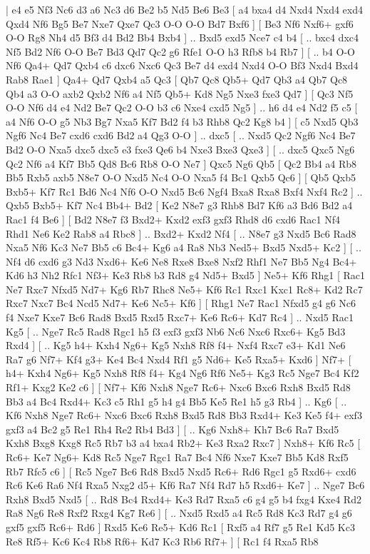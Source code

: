 \makegametitle 
|   e4   e5    Nf3   Nc6    d3   a6    Nc3   d6    Be2   b5    Nd5   Be6    Be3 [  a4 bxa4  d4 Nxd4  Nxd4 exd4  Qxd4 Nf6  Bg5 Be7  Nxe7 Qxe7  Qc3 O-O  O-O Bd7  Bxf6   ]  [  Be3 Nf6  Nxf6+ gxf6  O-O Rg8  Nh4 d5  Bf3 d4  Bd2 Bb4  Bxb4   ] .. Bxd5    exd5   Nce7    c4   b4 [ .. bxc4  dxc4 Nf5  Bd2 Nf6  O-O Be7  Bd3 Qd7  Qc2 g6  Rfe1 O-O  h3 Rfb8  b4 Rb7   ]  [ .. b4  O-O Nf6  Qa4+ Qd7  Qxb4 c6  dxc6 Nxc6  Qc3 Be7  d4 exd4  Nxd4 O-O  Bf3 Nxd4  Bxd4 Rab8  Rae1   ]  Qa4+   Qd7    Qxb4   a5    Qc3 [  Qb7 Qc8  Qb5+ Qd7  Qb3 a4  Qb7 Qc8  Qb4 a3  O-O axb2  Qxb2 Nf6  a4 Nf5  Qb5+ Kd8  Ng5 Nxe3  fxe3 Qd7   ]  [  Qc3 Nf5  O-O Nf6  d4 e4  Nd2 Be7  Qc2 O-O  b3 c6  Nxe4 cxd5  Ng5   ] .. h6    d4   e4    Nd2   f5    c5 [  a4 Nf6  O-O g5  Nb3 Bg7  Nxa5 Kf7  Bd2 f4  b3 Rhb8  Qc2 Kg8  b4   ]  [  c5 Nxd5  Qb3 Ngf6  Nc4 Be7  cxd6 cxd6  Bd2 a4  Qg3 O-O   ] .. dxc5 [ .. Nxd5  Qc2 Ngf6  Nc4 Be7  Bd2 O-O  Nxa5 dxc5  dxc5 e3  fxe3 Qe6  b4 Nxe3  Bxe3 Qxe3   ]  [ .. dxc5  Qxc5 Ng6  Qc2 Nf6  a4 Kf7  Bb5 Qd8  Bc6 Rb8  O-O Ne7   ]  Qxc5   Ng6    Qb5 [  Qc2 Bb4  a4 Rb8  Bb5 Rxb5  axb5 N8e7  O-O Nxd5  Nc4 O-O  Nxa5 f4  Bc1 Qxb5  Qc6   ]  [  Qb5 Qxb5  Bxb5+ Kf7  Rc1 Bd6  Nc4 Nf6  O-O Nxd5  Bc6 Ngf4  Bxa8 Rxa8  Bxf4 Nxf4  Rc2   ] .. Qxb5    Bxb5+   Kf7    Nc4   Bb4+    Bd2 [  Ke2 N8e7  g3 Rhb8  Bd7 Kf6  a3 Bd6  Bd2 a4  Rac1 f4  Be6   ]  [  Bd2 N8e7  f3 Bxd2+  Kxd2 exf3  gxf3 Rhd8  d6 cxd6  Rac1 Nf4  Rhd1 Ne6  Ke2 Rab8  a4 Rbc8   ] .. Bxd2+    Kxd2   Nf4 [ .. N8e7  g3 Nxd5  Bc6 Rad8  Nxa5 Nf6  Kc3 Ne7  Bb5 c6  Bc4+ Kg6  a4 Ra8  Nb3 Ned5+  Bxd5 Nxd5+  Kc2   ]  [ .. Nf4  d6 cxd6  g3 Nd3  Nxd6+ Ke6  Ne8 Rxe8  Bxe8 Nxf2  Rhf1 Ne7  Bb5 Ng4  Bc4+ Kd6  h3 Nh2  Rfc1 Nf3+  Ke3 Rb8  b3 Rd8  g4 Nd5+  Bxd5   ]  Ne5+   Kf6    Rhg1 [  Rac1 Ne7  Rxc7 Nfxd5  Nd7+ Kg6  Rb7 Rhc8  Ne5+ Kf6  Rc1 Rxc1  Kxc1 Rc8+  Kd2 Rc7  Rxc7 Nxc7  Bc4 Ncd5  Nd7+ Ke6  Nc5+ Kf6   ]  [  Rhg1 Ne7  Rac1 Nfxd5  g4 g6  Nc6 f4  Nxe7 Kxe7  Bc6 Rad8  Bxd5 Rxd5  Rxc7+ Ke6  Rc6+ Kd7  Rc4   ] .. Nxd5    Rac1   Kg5 [ .. Nge7  Rc5 Rad8  Rgc1 h5  f3 exf3  gxf3 Nb6  Nc6 Nxc6  Rxc6+ Kg5  Bd3 Rxd4   ]  [ .. Kg5  h4+ Kxh4  Ng6+ Kg5  Nxh8 Rf8  f4+ Nxf4  Rxc7 e3+  Kd1 Ne6  Ra7 g6  Nf7+ Kf4  g3+ Ke4  Bc4 Nxd4  Rf1 g5  Nd6+ Ke5  Rxa5+ Kxd6   ]  Nf7+ [  h4+ Kxh4  Ng6+ Kg5  Nxh8 Rf8  f4+ Kg4  Ng6 Rf6  Ne5+ Kg3  Rc5 Nge7  Bc4 Kf2  Rf1+ Kxg2  Ke2 c6   ]  [  Nf7+ Kf6  Nxh8 Nge7  Rc6+ Nxc6  Bxc6 Rxh8  Bxd5 Rd8  Bb3 a4  Bc4 Rxd4+  Kc3 c5  Rh1 g5  h4 g4  Bb5 Ke5  Re1 h5  g3 Rb4   ] .. Kg6 [ .. Kf6  Nxh8 Nge7  Rc6+ Nxc6  Bxc6 Rxh8  Bxd5 Rd8  Bb3 Rxd4+  Ke3 Ke5  f4+ exf3  gxf3 a4  Bc2 g5  Re1 Rh4  Re2 Rb4  Bd3   ]  [ .. Kg6  Nxh8+ Kh7  Bc6 Ra7  Bxd5 Kxh8  Bxg8 Kxg8  Rc5 Rb7  b3 a4  bxa4 Rb2+  Ke3 Rxa2  Rxc7   ]  Nxh8+   Kf6    Rc5 [  Rc6+ Ke7  Ng6+ Kd8  Rc5 Nge7  Rgc1 Ra7  Bc4 Nf6  Nxe7 Kxe7  Bb5 Kd8  Rxf5 Rb7  Rfc5 c6   ]  [  Rc5 Nge7  Bc6 Rd8  Bxd5 Nxd5  Rc6+ Rd6  Rgc1 g5  Rxd6+ cxd6  Rc6 Ke6  Ra6 Nf4  Rxa5 Nxg2  d5+ Kf6  Ra7 Nf4  Rd7 h5  Rxd6+ Ke7   ] .. Nge7    Bc6   Rxh8    Bxd5   Nxd5 [ .. Rd8  Bc4 Rxd4+  Ke3 Rd7  Rxa5 c6  g4 g5  b4 fxg4  Kxe4 Rd2  Ra8 Ng6  Re8 Rxf2  Rxg4 Kg7  Re6   ]  [ .. Nxd5  Rxd5 a4  Rc5 Rd8  Kc3 Rd7  g4 g6  gxf5 gxf5  Rc6+ Rd6   ]  Rxd5   Ke6    Re5+   Kd6    Rc1 [  Rxf5 a4  Rf7 g5  Re1 Kd5  Kc3 Re8  Rf5+ Kc6  Kc4 Rb8  Rf6+ Kd7  Kc3 Rb6  Rf7+   ]  [  Rc1 f4  Rxa5 Rb8  